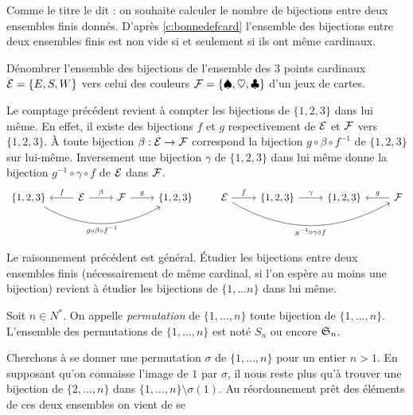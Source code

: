 \documentclass[12pt, a4paper]{article}
\begin{document}
Comme le titre le dit : on souhaite calculer le nombre de bijections
entre deux ensembles finis donnés. D'après \ref{c:bonnedefcard}
l'ensemble des bijections entre deux ensembles finis est non vide si
et seulement si ils ont même cardinaux.
\begin{question}
  \label{q:bijection}
  Dénombrer l'ensemble des bijections de l'ensemble des $3$ points
  cardinaux $\mathcal{E} = \{E, S, W\}$ vers celui des couleurs
  $\mathcal{F} = \{\spadesuit, \heartsuit, \clubsuit\}$ d'un jeux de
  cartes.
\end{question}
\begin{rem}
  Le comptage précédent revient à compter les bijections de
  $\{1, 2, 3\}$ dans lui même. En effet, il existe des bijections
  $f$ et $g$ respectivement de $\mathcal{E}$ et $\mathcal{F}$ vers
  $\{1, 2, 3\}$. À toute bijection $\beta : \mathcal{E} \to \mathcal{F}$
  correspond la bijection $g\circ\beta\circ f^{-1}$ de $\{1, 2, 3\}$
  sur lui-même. Inversement une bijection $\gamma$ de $\{1, 2, 3\}$
  dans lui même donne la bijection $g^{-1}\circ\gamma\circ f$ de
  $\mathcal{E}$ dans $\mathcal{F}$.
  \[
    \begin{tikzcd}
      \{1, 2, 3\}
      \arrow[rrr, bend right, "g\circ\beta\circ f^{-1}" below] &
      \mc{E} \arrow[l, "f" above] \arrow[r, "\beta"] &
      \mc{F} \arrow[r, "g"] &
      \{1, 2, 3\}
    \end{tikzcd}
    \qquad
    \begin{tikzcd}
      \mc{E} \arrow[r, "f"]
      \arrow[rrr, bend right, "g^{-1}\circ\gamma\circ f" below] &
      \{1, 2, 3\} \arrow[r, "\gamma"] &
      \{1, 2, 3\} &
      \mc{F} \arrow[l, "g" above]
    \end{tikzcd}
  \]
\end{rem}
Le raisonnement précédent est général. Étudier les bijections entre
deux ensembles finis (nécessairement de même cardinal, si l'on espère
au moins une bijection) revient à étudier les bijections de
$\{1, \ldots n\}$ dans lui même.
\begin{nota}
  Soit $n \in N^*$. On appelle \emph{permutation} de
  $\{1, \ldots, n\}$ toute bijection de $\{1, \ldots, n\}$. L'ensemble
  des permutations de $\{1, \ldots, n\}$ est noté $S_n$ ou encore
  $\mathfrak{S}_n$.
\end{nota}
Cherchons à se donner une permutation $\sigma$ de $\{1, \ldots, n\}$
pour un entier $n > 1$. En supposant qu'on connaisse l'image de $1$
par $\sigma$, il nous reste plus qu'à trouver une bijection de
$\{2, \ldots, n\}$ dans $\{1, \ldots, n\}\setminus \sigma(1)$. Au
réordonnement prêt des éléments de ces deux ensembles on vient de se
\end{document}
